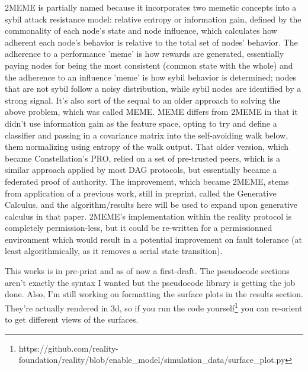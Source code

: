 \documentclass{article}
\begin{document}
2MEME is partially named because it incorporates two memetic concepts into a sybil attack resistance model: relative entropy or information gain, defined by the commonality of each node's state and node influence, which calculates how adherent each node's behavior is relative to the total set of nodes' behavior. The adherence to a performance 'meme' is how rewards are generated, essentially paying nodes for being the most consistent (common state with the whole) and the adherence to an influence 'meme' is how sybil behavior is determined; nodes that are not sybil follow a noisy distribution, while sybil nodes are identified by a strong signal. It's also sort of the sequal to an older approach to solving the above problem, which was called MEME. MEME differs from 2MEME in that it didn't use information gain as the feature space, opting to try and define a classifier and passing in a covariance matrix into the self-avoiding walk below, them normalizing using entropy of the walk output. That older version, which became Constellation's PRO, relied on a set of pre-trusted peers, which is a similar approach applied by most DAG protocols, but essentially became a federated proof of authority. The improvement, which became 2MEME, stems from application of a previous work, still in preprint, called the Generative Calculus, and the algorithm/results here will be used to expand upon generative calculus in that paper. 2MEME's implementation within the reality protocol is completely permission-less, but it could be re-written for a permissionned environment which would result in a potential improvement on fault tolerance (at least algorithmically, as it removes a serial state transition).

This works is in pre-print and as of now a first-draft. The pseudocode sections aren't exactly the syntax I wanted but the pseudocode library is getting the job done. Also, I'm still working on formatting the surface plots in the results section. They're actually rendered in 3d, so if you run the code yourself\footnote{https://github.com/reality-foundation/reality/blob/enable\_model/simulation\_data/surface\_plot.py} you can re-orient to get different views of the surfaces.
\end{document}
